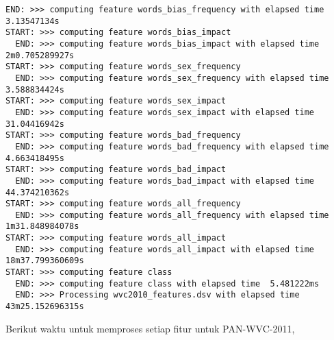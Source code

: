 \begin{lstlisting}[style=data,basicstyle=\tiny\ttfamily]
  END: >>> computing feature words_bias_frequency with elapsed time  3.13547134s
START: >>> computing feature words_bias_impact
  END: >>> computing feature words_bias_impact with elapsed time  2m0.705289927s
START: >>> computing feature words_sex_frequency
  END: >>> computing feature words_sex_frequency with elapsed time  3.588834424s
START: >>> computing feature words_sex_impact
  END: >>> computing feature words_sex_impact with elapsed time  31.04416942s
START: >>> computing feature words_bad_frequency
  END: >>> computing feature words_bad_frequency with elapsed time  4.663418495s
START: >>> computing feature words_bad_impact
  END: >>> computing feature words_bad_impact with elapsed time  44.374210362s
START: >>> computing feature words_all_frequency
  END: >>> computing feature words_all_frequency with elapsed time  1m31.848984078s
START: >>> computing feature words_all_impact
  END: >>> computing feature words_all_impact with elapsed time  18m37.799360609s
START: >>> computing feature class
  END: >>> computing feature class with elapsed time  5.481222ms
  END: >>> Processing wvc2010_features.dsv with elapsed time  43m25.152696315s
\end{lstlisting}

Berikut waktu untuk memproses setiap fitur untuk PAN-WVC-2011,

